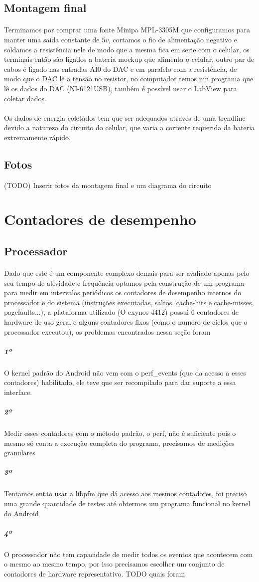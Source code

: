 \documentclass[11pt,a4paper,titlepage]{article}
\begin{document}
\subsection{Montagem final}
\paragraph{} Terminamos por comprar uma fonte Minipa MPL-3305M que configuramos para manter uma saída constante de $5v$, cortamos o fio de alimentação negativo e soldamos a resistência nele de modo que a mesma fica em serie com o celular, os terminais então são ligados a bateria mockup que alimenta o celular, outro par de cabos é ligado nas entradas AI0 do DAC e em paralelo com a resistência, de modo que o DAC lê a tensão no resistor, no computador temos um programa que lê os dados do DAC (NI-6121USB), também é possível usar o LabView para coletar dados.
\paragraph{} Os dados de energia coletados tem que ser adequados através de uma trendline devido a natureza do circuito do celular, que varia a corrente requerida da bateria extremamente rápido.
\subsection{Fotos}
(TODO) Inserir fotos da montagem final e um diagrama do circuito
\section{Contadores de desempenho}
\subsection{Processador}
\paragraph{} Dado que este é um componente complexo demais para ser avaliado apenas pelo seu tempo de atividade e frequência optamos pela construção de um programa para medir em intervalos periódicos os contadores de desempenho internos do processador e do sistema (instruções executadas, saltos, cache-hits e cache-misses, pagefaults...), a plataforma utilizado (O exynos 4412) possui 6 contadores de hardware de uso geral e alguns contadores fixos (como o numero de ciclos que o processador executou), os problemas encontrados nessa seção foram
\subparagraph{1º} O kernel padrão do Android não vem com o perf\_events (que da acesso a esses contadores) habilitado, ele teve que ser recompilado para dar suporte a essa interface.
\subparagraph{2º} Medir esses contadores com o método padrão, o perf, não é suficiente pois o mesmo só conta a execução completa do programa, precisamos de medições granulares
\subparagraph{3º} Tentamos então usar a libpfm que dá acesso aos mesmos contadores, foi preciso uma grande quantidade de testes até obtermos um programa funcional no kernel do Android
\subparagraph{4º} O processador não tem capacidade de medir todos os eventos que acontecem com o mesmo ao mesmo tempo, por isso precisamos escolher um conjunto de contadores de hardware representativo. TODO quais foram
\end{document}
